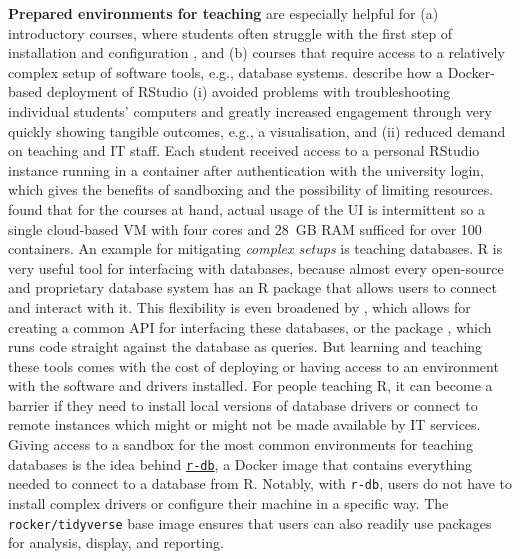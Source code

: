 \textbf{Prepared environments for teaching} are especially helpful for
(a) introductory courses, where students often struggle with the first
step of installation and configuration
\citep{cetinkaya-rundel_infrastructure_2018}, and (b) courses that
require access to a relatively complex setup of software tools, e.g.,
database systems. \citet{cetinkaya-rundel_infrastructure_2018} describe
how a Docker-based deployment of RStudio (i) avoided problems with
troubleshooting individual students' computers and greatly increased
engagement through very quickly showing tangible outcomes, e.g., a
visualisation, and (ii) reduced demand on teaching and IT staff. Each
student received access to a personal RStudio instance running in a
container after authentication with the university login, which gives
the benefits of sandboxing and the possibility of limiting resources.
\citet{cetinkaya-rundel_infrastructure_2018} found that for the courses
at hand, actual usage of the UI is intermittent so a single cloud-based
VM with four cores and 28~GB RAM sufficed for over 100 containers. An
example for mitigating \emph{complex setups} is teaching databases. R is
very useful tool for interfacing with databases, because almost every
open-source and proprietary database system has an R package that allows
users to connect and interact with it. This flexibility is even
broadened by  \citep{cran_dbi}, which allows for creating a
common API for interfacing these databases, or the 
package \citep{cran_dbplyr}, which runs 
\citep{cran_dplyr} code straight against the database as queries. But
learning and teaching these tools comes with the cost of deploying or
having access to an environment with the software and drivers installed.
For people teaching R, it can become a barrier if they need to install
local versions of database drivers or connect to remote instances which
might or might not be made available by IT services. Giving access to a
sandbox for the most common environments for teaching databases is the
idea behind \href{https://github.com/ColinFay/r-db}{\texttt{r-db}}, a
Docker image that contains everything needed to connect to a database
from R. Notably, with \texttt{r-db}, users do not have to install
complex drivers or configure their machine in a specific way. The
\texttt{rocker/tidyverse} base image ensures that users can also readily
use packages for analysis, display, and reporting.

